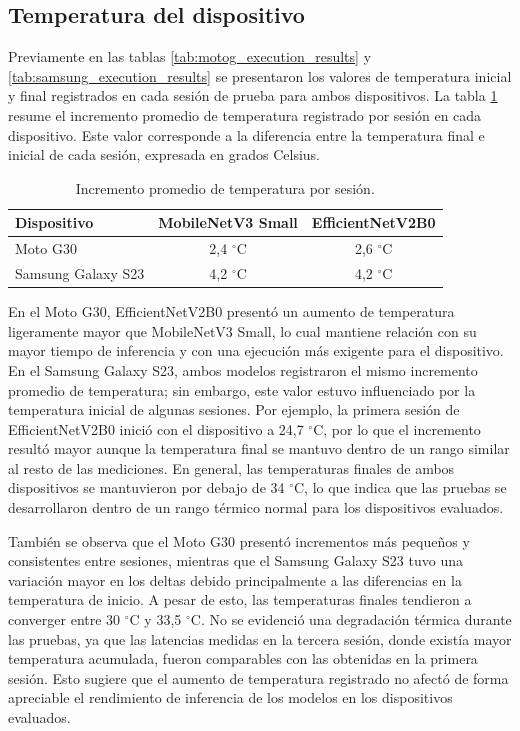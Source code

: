 \subsection{Temperatura del dispositivo}

Previamente en las tablas \ref{tab:motog_execution_results} y \ref{tab:samsung_execution_results} se presentaron los valores de temperatura inicial y final 
registrados en cada sesión de prueba para ambos dispositivos.
La tabla \ref{tab:temperature_average_increase} resume el incremento promedio de temperatura registrado por sesión en cada dispositivo.
Este valor corresponde a la diferencia entre la temperatura final e inicial de cada sesión, expresada en grados Celsius.

\begin{table}[H]
    \centering
    \caption{Incremento promedio de temperatura por sesión.\label{tab:temperature_average_increase}}
    \begin{tabular}{|l|c|c|}
        \hline
        \textbf{Dispositivo} & \textbf{MobileNetV3 Small} & \textbf{EfficientNetV2B0} \\
        \hline
        Moto G30 & 2,4 $^\circ$C & 2,6 $^\circ$C \\
        \hline
        Samsung Galaxy S23 & 4,2 $^\circ$C & 4,2 $^\circ$C \\
        \hline
    \end{tabular}
\end{table}

En el Moto G30, EfficientNetV2B0 presentó un aumento de temperatura ligeramente mayor que MobileNetV3 Small, lo cual mantiene relación
con su mayor tiempo de inferencia y con una ejecución más exigente para el dispositivo. En el Samsung Galaxy S23, ambos modelos registraron
el mismo incremento promedio de temperatura; sin embargo, este valor estuvo influenciado por la temperatura inicial de algunas sesiones. Por
ejemplo, la primera sesión de EfficientNetV2B0 inició con el dispositivo a 24,7 $^\circ$C, por lo que el incremento resultó mayor aunque la
temperatura final se mantuvo dentro de un rango similar al resto de las mediciones. En general, las temperaturas finales de ambos dispositivos
se mantuvieron por debajo de 34 $^\circ$C, lo que indica que las pruebas se desarrollaron dentro de un rango térmico normal para los
dispositivos evaluados.

También se observa que el Moto G30 presentó incrementos más pequeños y consistentes entre sesiones, mientras que el Samsung Galaxy S23 tuvo
una variación mayor en los deltas debido principalmente a las diferencias en la temperatura de inicio. A pesar de esto, las temperaturas
finales tendieron a converger entre 30 $^\circ$C y 33,5 $^\circ$C. No se evidenció una degradación térmica durante las pruebas, ya que las
latencias medidas en la tercera sesión, donde existía mayor temperatura acumulada, fueron comparables con las obtenidas en la primera sesión.
Esto sugiere que el aumento de temperatura registrado no afectó de forma apreciable el rendimiento de inferencia de los modelos en los
dispositivos evaluados.


